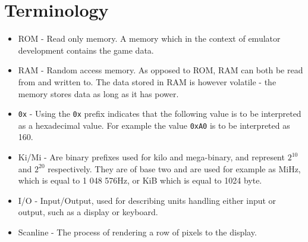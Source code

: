 \chapter*{Terminology}
\thispagestyle{plain}			%

\begin{itemize}
    \item ROM - Read only memory. A memory which in the context of emulator development contains the game data.
    \item RAM - Random access memory. As opposed to ROM, RAM can both be read from and written to. The data stored in RAM is however volatile - the memory stores data as long as it has power.
    \item \texttt{0x} - Using the \texttt{0x} prefix indicates that the following value is to be interpreted as a hexadecimal value. For example the value \texttt{0xA0} is to be interpreted as 160.
    \item Ki/Mi - Are binary prefixes used for kilo and mega-binary, and represent $2^{10}$ and $2^{20}$ respectively. They are of base two and are used for example as MiHz, which is equal to 1 048 576Hz, or KiB which is equal to 1024 byte.
    \item I/O - Input/Output, used for describing units handling either input or output, such as a display or keyboard.
    \item Scanline - The process of rendering a row of pixels to the display.
\end{itemize}

\newpage				%
\thispagestyle{plain}